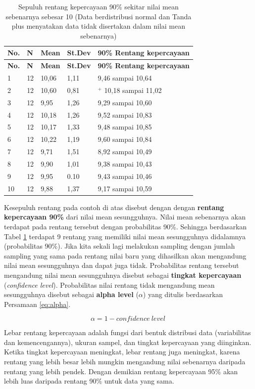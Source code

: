 \documentclass[]{book}
\begin{document}
\begin{longtable}[]{@{}lllll@{}}
\caption{\label{tab:iie} Sepuluh rentang kepercayaan 90\% sekitar nilai mean
sebenarnya sebesar 10 (Data berdistribusi normal dan Tanda plus
menyatakan data tidak disertakan dalam nilai mean
sebenarnya)}\tabularnewline
\toprule
\textbf{No.} & \textbf{N} & \textbf{Mean} & \textbf{St.Dev} &
\textbf{90\% Rentang kepercayaan}\tabularnewline
\midrule
\endfirsthead
\toprule
\textbf{No.} & \textbf{N} & \textbf{Mean} & \textbf{St.Dev} &
\textbf{90\% Rentang kepercayaan}\tabularnewline
\midrule
\endhead
1 & 12 & 10,06 & 1,11 & 9,46 sampai 10,64\tabularnewline
2 & 12 & 10,60 & 0,81 & \(^+\) 10,18 sampai 11,02\tabularnewline
3 & 12 & 9,95 & 1,26 & 9,29 sampai 10,60\tabularnewline
4 & 12 & 10,18 & 1,26 & 9,52 sampai 10,83\tabularnewline
5 & 12 & 10,17 & 1,33 & 9,48 sampai 10,85\tabularnewline
6 & 12 & 10,22 & 1,19 & 9,60 sampai 10,84\tabularnewline
7 & 12 & 9,71 & 1,51 & 8,92 sampai 10,49\tabularnewline
8 & 12 & 9,90 & 1,01 & 9,38 sampai 10,43\tabularnewline
9 & 12 & 9,95 & 0.10 & 9,43 sampai 10,46\tabularnewline
10 & 12 & 9,88 & 1,37 & 9,17 sampai 10,59\tabularnewline
\bottomrule
\end{longtable}

Kesepuluh rentang pada contoh di atas disebut dengan dengan
\textbf{rentang kepercayaan 90\%} dari nilai mean sesungguhnya. Nilai
mean sebenarnya akan terdapat pada rentang tersebut dengan probabilitas
90\%. Sehingga berdasarkan Tabel \ref{tab:iie} terdapat 9 rentang yang
memiliki nilai mean sesungguhnya didalamnya (probabilitas 90\%). Jika
kita sekali lagi melakukan sampling dengan jumlah sampling yang sama
pada rentang nilai baru yang dihasilkan akan mengandung nilai mean
sesungguhnya dan dapat juga tidak. Probabilitas rentang tersebut
mengandung nilai mean sesungguhnya disebut sebagai \textbf{tingkat
kepercayaan} (\emph{confidence level}). Probabilitas nilai rentang tidak
mengandung mean sesungguhnya disebut sebagai \textbf{alpha level}
(\(\alpha\)) yang ditulis berdasarkan Persamaan \eqref{eq:alpha}.

\begin{equation}
  \alpha=1-confidence\ level\ 
  \label{eq:alpha}
\end{equation}

Lebar rentang kepercayaan adalah fungsi dari bentuk distribusi data
(variabilitas dan kemencengannya), ukuran sampel, dan tingkat
kepercayaan yang diinginkan. Ketika tingkat kepercayaan meningkat, lebar
rentang juga meningkat, karena rentang yang lebih besar lebih mungkin
mengandung nilai sebenarnya daripada rentang yang lebih pendek. Dengan
demikian rentang kepercayaan 95\% akan lebih luas daripada rentang 90\%
untuk data yang sama.
\end{document}
